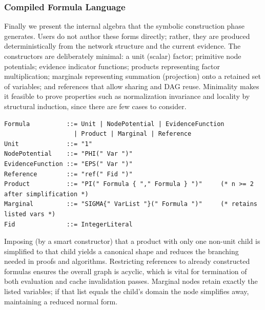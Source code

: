 \documentclass[11pt]{article}
\begin{document}
\subsubsection{Compiled Formula Language}
Finally we present the internal algebra that the symbolic construction phase generates. Users do not author these forms directly; rather, they are produced deterministically from the network structure and the current evidence. The constructors are deliberately minimal: a unit (scalar) factor; primitive node potentials; evidence indicator functions; products representing factor multiplication; marginals representing summation (projection) onto a retained set of variables; and references that allow sharing and DAG reuse. Minimality makes it feasible to prove properties such as normalization invariance and locality by structural induction, since there are few cases to consider.
\begin{lstlisting}[language=EBNF]
Formula          ::= Unit | NodePotential | EvidenceFunction
				   | Product | Marginal | Reference
Unit             ::= "1"
NodePotential    ::= "PHI(" Var ")"
EvidenceFunction ::= "EPS(" Var ")"
Reference        ::= "ref(" Fid ")"
Product          ::= "PI(" Formula { "," Formula } ")"     (* n >= 2 after simplification *)
Marginal         ::= "SIGMA{" VarList "}(" Formula ")"     (* retains listed vars *)
Fid              ::= IntegerLiteral
\end{lstlisting}
Imposing (by a smart constructor) that a product with only one non-unit child is simplified to that child yields a canonical shape and reduces the branching needed in proofs and algorithms. Restricting references to already constructed formulas ensures the overall graph is acyclic, which is vital for termination of both evaluation and cache invalidation passes. Marginal nodes retain exactly the listed variables; if that list equals the child's domain the node simplifies away, maintaining a reduced normal form.
\end{document}
